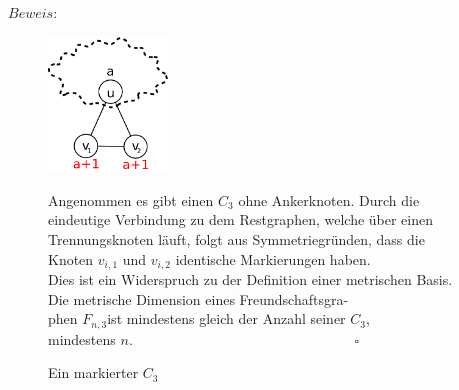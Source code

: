 $Beweis:$
\vspace{-7mm}
\begin{figure}
\vspace{-7mm}
\begin{minipage}[l]{170pt}
\centering
\includegraphics[width=90pt]{bilder/freundschaftsgraphbew.pdf}
\caption{Ein markierter $C_3$}
\end{minipage}
\begin{minipage}[r]{250pt}
Angenommen es gibt einen $C_3$ ohne Ankerknoten. Durch die eindeutige Verbindung zu dem Restgraphen, welche über einen Trennungsknoten läuft, folgt aus Symmetriegründen, dass die Knoten $v_{i,1}$ und $v_{i,2}$ identische Markierungen haben.\\Dies ist ein Widerspruch zu der Definition einer metrischen Basis.\\
Die metrische Dimension eines Freundschaftsgra-\\phen $F_{n,3}$ist mindestens gleich der Anzahl seiner $C_{3}$,\\mindestens $n$.$\;\;\;\;\;\;\;\;\;\;\;\;\;\;\;\;\;\;\;\;\;\;\;\;\;\;\;\;\;\;\;\;\;\;\;\;\;\;\;\;\;\;\;\;\;\;\;\;\;\;\;\;\;\;\;\;\;\square$
\end{minipage}
\end{figure}

